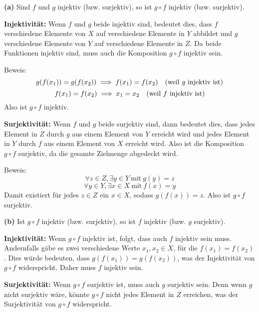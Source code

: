 \documentclass[11pt]{article}
\begin{document}
\medskip

\textbf{(a)} Sind \( f \) und \( g \) injektiv (bzw. surjektiv), so ist \( g \circ f \) injektiv (bzw. surjektiv).
\smallskip

\textbf{Injektivität:} Wenn \( f \) und \( g \) beide injektiv sind, bedeutet dies, dass \( f \) verschiedene Elemente von \( X \) auf verschiedene Elemente in \( Y \) abbildet und \( g \) verschiedene Elemente von \( Y \) auf verschiedene Elemente in \( Z \). Da beide Funktionen injektiv sind, muss auch die Komposition \( g \circ f \) injektiv sein.

Beweis:
\[
g(f(x_1)) = g(f(x_2)) \implies f(x_1) = f(x_2) \quad \text{(weil \( g \) injektiv ist)}
\]
\[
f(x_1) = f(x_2) \implies x_1 = x_2 \quad \text{(weil \( f \) injektiv ist)}
\]
Also ist \( g \circ f \) injektiv.

\medskip

\textbf{Surjektivität:} Wenn \( f \) und \( g \) beide surjektiv sind, dann bedeutet dies, dass jedes Element in \( Z \) durch \( g \) aus einem Element von \( Y \) erreicht wird und jedes Element in \( Y \) durch \( f \) aus einem Element von \( X \) erreicht wird. Also ist die Komposition \( g \circ f \) surjektiv, da die gesamte Zielmenge abgedeckt wird.

Beweis:
\[
\forall z \in Z, \exists y \in Y \ \text{mit} \ g(y) = z
\]
\[
\forall y \in Y, \exists x \in X \ \text{mit} \ f(x) = y
\]
Damit existiert für jedes \( z \in Z \) ein \( x \in X \), sodass \( g(f(x)) = z \). Also ist \( g \circ f \) surjektiv.

\bigskip

\textbf{(b)} Ist \( g \circ f \) injektiv (bzw. surjektiv), so ist \( f \) injektiv (bzw. \( g \) surjektiv).

\smallskip

\textbf{Injektivität:} Wenn \( g \circ f \) injektiv ist, folgt, dass auch \( f \) injektiv sein muss. Andernfalls gäbe es zwei verschiedene Werte \( x_1, x_2 \in X \), für die \( f(x_1) = f(x_2) \). Dies würde bedeuten, dass \( g(f(x_1)) = g(f(x_2)) \), was der Injektivität von \( g \circ f \) widerspricht. Daher muss \( f \) injektiv sein.

\medskip

\textbf{Surjektivität:} Wenn \( g \circ f \) surjektiv ist, muss auch \( g \) surjektiv sein. Denn wenn \( g \) nicht surjektiv wäre, könnte \( g \circ f \) nicht jedes Element in \( Z \) erreichen, was der Surjektivität von \( g \circ f \) widerspricht.
\end{document}
